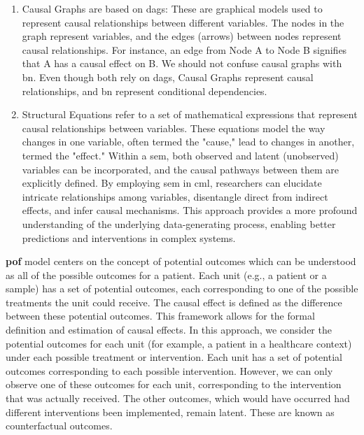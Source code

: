 \begin{enumerate}
    \item Causal Graphs are based on \acp{dag}: These are graphical models used to represent causal relationships between different variables. The nodes in the graph represent variables, and the edges (arrows) between nodes represent causal relationships. For instance, an edge from Node A to Node B signifies that A has a causal effect on B. We should not confuse causal graphs with \ac{bn}. Even though both rely on \acp{dag}, Causal Graphs represent causal relationships, and \ac{bn} represent conditional dependencies.

    \item Structural Equations refer to a set of mathematical expressions that represent causal relationships between variables. These equations model the way changes in one variable, often termed the "cause," lead to changes in another, termed the "effect." Within a \ac{sem}, both observed and latent (unobserved) variables can be incorporated, and the causal pathways between them are explicitly defined. By employing \ac{sem} in \ac{cml}, researchers can elucidate intricate relationships among variables, disentangle direct from indirect effects, and infer causal mechanisms. This approach provides a more profound understanding of the underlying data-generating process, enabling better predictions and interventions in complex systems.

\end{enumerate}

\textbf{\Ac{pof}} model centers on the concept of potential outcomes which can be understood as all of the possible outcomes for a patient.  Each unit (e.g., a patient or a sample) has a set of potential outcomes, each corresponding to one of the possible treatments the unit could receive. The causal effect is defined as the difference between these potential outcomes. This framework allows for the formal definition and estimation of causal effects. In this approach, we consider the potential outcomes for each unit (for example, a patient in a healthcare context) under each possible treatment or intervention. Each unit has a set of potential outcomes corresponding to each possible intervention. However, we can only observe one of these outcomes for each unit, corresponding to the intervention that was actually received. The other outcomes, which would have occurred had different interventions been implemented, remain latent. These are known as counterfactual outcomes.

